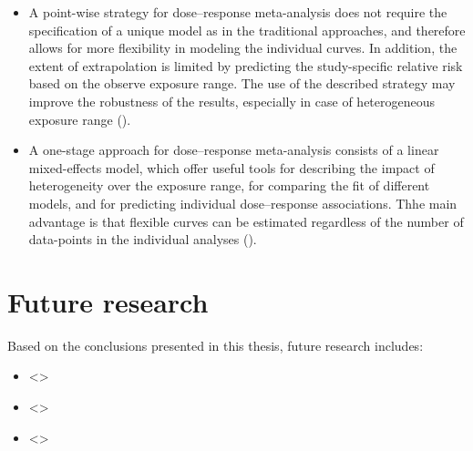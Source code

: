 \documentclass[11pt,a4paper,twoside,openany]{book}\usepackage{knitr}
\begin{document}
{\begin{itemize}
\item A point-wise strategy for dose--response meta-analysis does not require the specification of a unique model as in the traditional approaches, and therefore allows for more flexibility in modeling the individual curves. In addition, the extent of extrapolation is limited by predicting the study-specific relative risk based on the observe exposure range. The use of the described strategy may improve the robustness of the results, especially in case of heterogeneous exposure range ().

\item A one-stage approach for dose--response meta-analysis consists of a linear mixed-effects model, which offer useful tools for describing the impact of heterogeneity over the exposure range, for comparing the fit of different models, and for predicting individual dose--response associations. Thhe main advantage is that flexible curves can be estimated regardless of the number of data-points in the individual analyses ().

\end{itemize}


%

\chapter{Future research}

Based on the conclusions presented in this thesis, future research includes: 

\begin{itemize}
\item <>

\item <>

\item <>
\end{itemize}

\appendix


%

}
\end{document}
